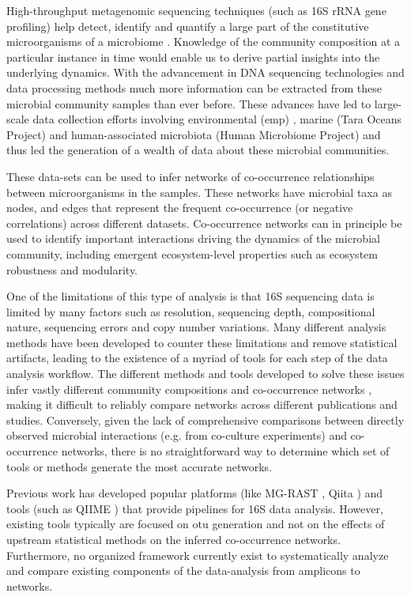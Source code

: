   High-throughput metagenomic sequencing techniques (such as 16S rRNA gene profiling) help detect, identify and quantify a large part of the constitutive microorganisms of a microbiome \cite{Jovel2016}.
  Knowledge of the community composition at a particular instance in time would enable us to derive partial insights into the underlying dynamics.
  With the advancement in DNA sequencing technologies \cite{Narihiro2017} and data processing methods much more information can be extracted from these microbial community samples than ever before.
  These advances have led to large-scale data collection efforts involving environmental (\acl{emp}) \cite{Thompson2017}, marine (Tara Oceans Project) \cite{Zhang2015} and human-associated microbiota (Human Microbiome Project) \cite{HumanMicrobiomeProjectConsortium2012} and thus led the generation of a wealth of data about these microbial communities.
  
  These data-sets can be used to infer networks of co-occurrence relationships between microorganisms in the samples.
  These networks have microbial taxa as nodes, and edges that represent the frequent co-occurrence (or negative correlations) across different datasets.
  Co-occurrence networks can in principle be used to identify important interactions driving the dynamics of the microbial community, including emergent ecosystem-level properties such as ecosystem robustness and modularity.

  One of the limitations of this type of analysis is that 16S sequencing data is limited by many factors such as resolution, sequencing depth, compositional nature, sequencing errors and copy number variations.
  Many different analysis methods have been developed \cite{Callahan2016,Amir2017,Friedman2012,Kurtz2015} to counter these limitations and remove statistical artifacts, leading to the existence of a myriad of tools for each step of the data analysis workflow.
  The different methods and tools developed to solve these issues infer vastly different community compositions and co-occurrence networks \cite{Golob2017,Weiss2016}, making it difficult to reliably compare networks across different publications and studies.
  Conversely, given the lack of comprehensive comparisons between directly observed microbial interactions (e.g. from co-culture experiments) and co-occurrence networks, there is no straightforward way to determine which set of tools or methods generate the most accurate networks.
  
 Previous work has developed popular platforms (like MG-RAST \cite{Keegan2016}, Qiita \cite{qiita}) and tools (such as QIIME \cite{Caporaso2010}) that provide pipelines for 16S data analysis.
 However, existing tools typically are focused on \ac{otu} generation and not on the effects of upstream statistical methods on the inferred co-occurrence networks.
 Furthermore, no organized framework currently exist to systematically analyze and compare existing components of the data-analysis from amplicons to networks.
  
